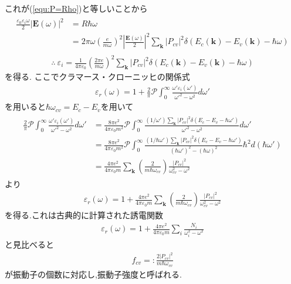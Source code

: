 \documentclass[uplatex,a4j,11pt,dvipdfmx]{jsarticle}
\begin{document}
これが(\ref{equ:P=Rho})と等しいことから
\begin{align*}
  \begin{split}
    \frac{\varepsilon_0\varepsilon_i\omega}{2}|{\bm E}(\omega)|^2&=R\hbar\omega\\
    &=2\pi\omega\left(\frac{e}{m\omega}\right)^2\left|\frac{{\bm E}(\omega)}{2}\right|^2
    \sum_{\bm k}|P_{cv}|^2\delta(E_c({\bm k})-E_v({\bm k})-\hbar\omega)
  \end{split}
\end{align*}
\begin{align}
  \therefore\ 
  \varepsilon_i=\frac{1}{4\pi\varepsilon_0}\left(\frac{2\pi e}{m\omega}\right)^2\sum_{\bm k}|P_{cv}|^2\delta(E_c({\bm k})-E_v({\bm k})-\hbar\omega)
\end{align}
を得る.
ここでクラマース・クローニッヒの関係式
\begin{align}
  \varepsilon_r(\omega)=1+\frac{2}{\pi}\mathcal{P}\int_0^\infty\frac{\omega'\varepsilon_i(\omega')}{\omega'^2-\omega^2}d\omega'
\end{align}
を用いると$\hbar\omega_{cv}=E_c-E_v$を用いて
\begin{align}
  \begin{split}
    \frac{2}{\pi}\mathcal{P}\int_0^\infty\frac{\omega'\varepsilon_i(\omega')}{\omega'^2-\omega^2}d\omega'
    &=\frac{8\pi e^2}{4\pi\varepsilon_0m^2}\mathcal{P}
    \int_0^\infty\frac{(1/\omega')\sum_{\bm k}|P_{cv}|^2\delta(E_c-E_v-\hbar\omega')}{\omega'^2-\omega^2}d\omega'\\
    &=\frac{8\pi e^2}{4\pi\varepsilon_0m^2}\mathcal{P}
    \int_0^\infty\frac{(1/\hbar\omega')\sum_{\bm k}|P_{cv}|^2\delta(E_c-E_v-\hbar\omega')}{(\hbar\omega')^2-(\hbar\omega)^2}\hbar^2d(\hbar\omega')\\
    &=\frac{4\pi e^2}{4\pi\varepsilon_0m}\sum_{\bm k}\left(\frac{2}{m\hbar\omega_{cv}}\right)\frac{|P_{cv}|^2}{\omega_{cv}^2-\omega^2}
  \end{split}
\end{align}
より
\begin{align}
  \varepsilon_r(\omega)=1+\frac{4\pi e^2}{4\pi\varepsilon_0m}\sum_{\bm k}\left(\frac{2}{m\hbar\omega_{cv}}\right)\frac{|P_{cv}|^2}{\omega_{cv}^2-\omega^2}
\end{align}
を得る.これは古典的に計算された誘電関数
\begin{align}
  \varepsilon_r(\omega)=1+\frac{4\pi e^2}{4\pi\varepsilon_0m}\sum_i\frac{N_i}{\omega_i^2-\omega^2}
\end{align}
と見比べると
\begin{align}
  f_{cv}=:\frac{2|P_{cv}|^2}{m\hbar\omega_{cv}}
\end{align}
が振動子の個数に対応し,振動子強度と呼ばれる.

\end{document}
